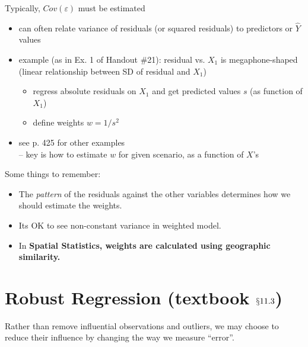 \documentclass[12pt]{notes}
\begin{document}


\begin{minipage}[l][2cm][c]{\textwidth}
\end{minipage}

Typically, $Cov(\varepsilon)$ must be estimated
\begin{itemize}
  \item can often relate variance of residuals (or squared residuals) to predictors or $\hat{Y}$ values
  \item example (as in Ex. 1 of Handout \#21): residual vs. $X_1$ is megaphone-shaped\\
       (linear relationship between SD of residual and $X_1$)
        \begin{itemize}
          \item regress absolute residuals on $X_1$ and get predicted values $s$ (as function of $X_1$)
          \item define weights $w = 1/s^2$
        \end{itemize}
  \item see p. 425 for other examples\\ -- key is how to estimate $w$ for given scenario, as a function of $X$'s
\end{itemize}

\nspace
Some things to remember:
\begin{itemize}
\item The \textit{pattern} of the residuals against the other variables determines how we should estimate the weights.
\item Its OK to see non-constant variance in weighted model. 
\item In \textbf{Spatial Statistics, weights are calculated using geographic similarity.}
\end{itemize}


\section{Robust Regression (textbook $\mathsection{11.3}$)}
Rather than remove influential observations and outliers, we may choose to reduce their influence by changing the way we measure ``error''.
\end{document}
